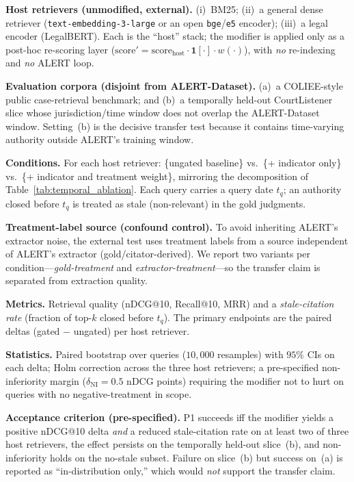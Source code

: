 \textbf{Host retrievers (unmodified, external).} (i)~BM25; (ii)~a general dense retriever (\texttt{text-embedding-3-large} or an open \texttt{bge}/\texttt{e5} encoder); (iii)~a legal encoder (LegalBERT). Each is the ``host'' stack; the modifier is applied only as a post-hoc re-scoring layer ($\mathrm{score}'=\mathrm{score}_{\text{host}}\cdot\mathbf{1}[\cdot]\cdot w(\cdot)$), with \emph{no} re-indexing and \emph{no} ALERT loop.

\textbf{Evaluation corpora (disjoint from ALERT-Dataset).} (a)~a COLIEE-style public case-retrieval benchmark; and (b)~a temporally held-out CourtListener slice whose jurisdiction/time window does not overlap the ALERT-Dataset window. Setting~(b) is the decisive transfer test because it contains time-varying authority outside ALERT's training window.

\textbf{Conditions.} For each host retriever: \{ungated baseline\} vs.\ \{+ indicator only\} vs.\ \{+ indicator and treatment weight\}, mirroring the decomposition of Table~\ref{tab:temporal_ablation}. Each query carries a query date $t_q$; an authority closed before $t_q$ is treated as stale (non-relevant) in the gold judgments.

\textbf{Treatment-label source (confound control).} To avoid inheriting ALERT's extractor noise, the external test uses treatment labels from a source independent of ALERT's extractor (gold/citator-derived). We report two variants per condition---\emph{gold-treatment} and \emph{extractor-treatment}---so the transfer claim is separated from extraction quality.

\textbf{Metrics.} Retrieval quality (nDCG@10, Recall@10, MRR) and a \emph{stale-citation rate} (fraction of top-$k$ closed before $t_q$). The primary endpoints are the paired deltas (gated $-$ ungated) per host retriever.

\textbf{Statistics.} Paired bootstrap over queries ($10{,}000$ resamples) with $95\%$ CIs on each delta; Holm correction across the three host retrievers; a pre-specified non-inferiority margin ($\delta_{\text{NI}}=0.5$ nDCG points) requiring the modifier not to hurt on queries with no negative-treatment in scope.

\textbf{Acceptance criterion (pre-specified).} P1 succeeds iff the modifier yields a positive nDCG@10 delta \emph{and} a reduced stale-citation rate on at least two of three host retrievers, the effect persists on the temporally held-out slice~(b), and non-inferiority holds on the no-stale subset. Failure on slice~(b) but success on~(a) is reported as ``in-distribution only,'' which would \emph{not} support the transfer claim.

